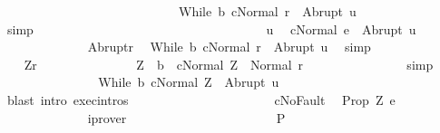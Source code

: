 \begin{isabellebody}
\ \ \ \ \ \ \ \ \ \ \ \ \ \ \ \ \ \ \ \ \ \ \ \ \ \ \ \ {\isasymGamma}{\isasymturnstile}{\isasymlangle}While\ b\ c{\isacharcomma}Normal\ r{\isasymrangle}\ {\isasymRightarrow}\ Abrupt\ u{\isachardoublequoteclose}\isanewline
\ \ \ \ \ \ \ \ \ \ \ \ \isamarkupfalse%
\ simp\isanewline
\ \ \ \ \ \ \ \ \ \ \isanewline
\ \ \ \ \ \ \ \ \ \ \ \isacommand{{\isacharbraceleft}}\isamarkupfalse%
\isanewline
\ \ \ \ \ \ \ \ \ \ \ \ \isamarkupfalse%
\ u\ \isamarkupfalse%
\ {\isachardoublequoteopen}{\isasymGamma}{\isasymturnstile}{\isasymlangle}c{\isacharcomma}Normal\ e{\isasymrangle}\ {\isasymRightarrow}\ Abrupt\ u{\isachardoublequoteclose}\isanewline
\ \ \ \ \ \ \ \ \ \ \ \ \isamarkupfalse%
\ Abrupt{\isacharunderscore}r\ \isamarkupfalse%
\ {\isachardoublequoteopen}{\isasymGamma}{\isasymturnstile}{\isasymlangle}While\ b\ c{\isacharcomma}Normal\ r{\isasymrangle}\ {\isasymRightarrow}\ Abrupt\ u{\isachardoublequoteclose}\ \isamarkupfalse%
\ simp\isanewline
\ \ \ \ \ \ \ \ \ \ \ \ \isamarkupfalse%
\ \isamarkupfalse%
\ \ Z{\isacharunderscore}r\ \isamarkupfalse%
\isanewline
\ \ \ \ \ \ \ \ \ \ \ \ \ \ {\isachardoublequoteopen}Z\ {\isasymin}\ b{\isachardoublequoteclose}\ \ {\isachardoublequoteopen}{\isasymGamma}{\isasymturnstile}{\isasymlangle}c{\isacharcomma}Normal\ Z{\isasymrangle}\ {\isasymRightarrow}\ Normal\ r{\isachardoublequoteclose}\isanewline
\ \ \ \ \ \ \ \ \ \ \ \ \ \ \isamarkupfalse%
\ simp\isanewline
\ \ \ \ \ \ \ \ \ \ \ \ \isamarkupfalse%
\ \isamarkupfalse%
\ {\isachardoublequoteopen}{\isasymGamma}{\isasymturnstile}{\isasymlangle}While\ b\ c{\isacharcomma}Normal\ Z{\isasymrangle}\ {\isasymRightarrow}\ Abrupt\ u{\isachardoublequoteclose}\isanewline
\ \ \ \ \ \ \ \ \ \ \ \ \ \ \isamarkupfalse%
\ {\isacharparenleft}blast\ intro{\isacharcolon}\ exec{\isachardot}intros{\isacharparenright}\isanewline
\ \ \ \ \ \ \ \ \ \ \isacommand{{\isacharbraceright}}\isamarkupfalse%
\isanewline
\ \ \ \ \ \ \ \ \ \ \isamarkupfalse%
\ cNoFault\ \isamarkupfalse%
\ {\isachardoublequoteopen}{\isacharquery}Prop\ Z\ e{\isachardoublequoteclose}\isanewline
\ \ \ \ \ \ \ \ \ \ \ \ \isamarkupfalse%
\ iprover\isanewline
\ \ \ \ \ \ \ \ \isamarkupfalse%
\isanewline
\ \ \ \ \ \ \isacommand{{\isacharbraceright}}\isamarkupfalse%
\isanewline
\ \ \ \ \ \ \isamarkupfalse%
\ P\ \isamarkupfalse%

\end{isabellebody}
